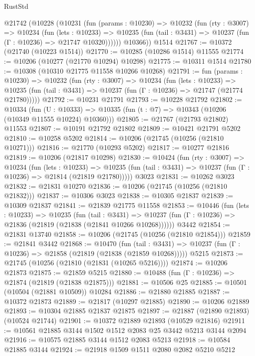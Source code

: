 \begin{lexlean}{RustStd}
\begin{coremodule}
    @21742
      (@10228
        (@10231
          (fun (params : @10230) =>
          @10232
            (fun (rty : @3007) =>
            @10234
              (fun (lets : @10233) =>
              @10235 (fun (tail : @3431) => @10237 (fun (Γ : @10236) => @21747 @10320))))))
        @10366))
    @1514
@21767 := @10372 (@21740 (@10223 @1514))
@21770 := @10285 (@10286 @1514) @11555
@21774 := @10206 (@10277 (@21770 @10294) @10298)
@21775 := @10311 @1514
@21780 := @10308 (@10310 @21775 @11558 @10266 @10268)
@21791 := fun (params : @10230) =>
  @10232
    (fun (rty : @3007) =>
    @10234
      (fun (lets : @10233) =>
      @10235 (fun (tail : @3431) => @10237 (fun (Γ : @10236) => @21747 (@21774 @21780)))))
@21792 := @10231 @21791
@21793 := @10228 @21792
@21802 := @10334
    (fun (U : @10333) => @10335 (fun (t : @7) => @10343 (@10206 (@10349 @11555 @10224) @10360)))
@21805 := @21767 (@21793 @21802) @11553
@21807 := @10191 @21792 @21802
@21809 := @10421 @21791 @5202
@21810 := @10258 @5202
@21814 := @10206 (@21745 (@10256 (@21810 @10271)))
@21816 := @21770 (@10293 @5202)
@21817 := @10277 @21816
@21819 := @10206 (@21817 @10298)
@21830 := @10424
    (fun (rty : @3007) =>
    @10234
      (fun (lets : @10233) =>
      @10235 (fun (tail : @3431) => @10237 (fun (Γ : @10236) => @21814 (@21819 @21780)))))
    @3023
@21831 := @10262 @3023
@21832 := @21831 @10270
@21836 := @10206 (@21745 (@10256 (@21810 @21832)))
@21837 := @10306 @3023
@21838 := @10305 @21837
@21839 := @10309 @21837
@21841 := @21839 @21775 @11558
@21853 := @10446
    (fun (lets : @10233) =>
    @10235
      (fun (tail : @3431) =>
      @10237 (fun (Γ : @10236) => @21836 (@21819 (@21838 (@21841 @10266 @10268))))))
    @3442
@21854 := @21831 @13740
@21858 := @10206 (@21745 (@10256 (@21810 @21854)))
@21859 := @21841 @3442
@21868 := @10470
    (fun (tail : @3431) => @10237 (fun (Γ : @10236) => @21858 (@21819 (@21838 (@21859 @10268)))))
    @5215
@21873 := @21745 (@10256 (@21810 (@21831 (@10265 @5216))))
@21874 := @10206 @21873
@21875 := @21859 @5215
@21880 := @10488 (fun (Γ : @10236) => @21874 (@21819 (@21838 @21875)))
@21881 := @10506 @25
@21885 := @10501 (@10504 (@21881 @10509)) @10284
@21886 := @21880 @21885
@21887 := @10372 @21873
@21889 := @21817 (@10297 @21885)
@21890 := @10206 @21889
@21893 := @10304 @21885 @21837 @21875
@21897 := @21887 (@21890 @21893) (@10524 @21744)
@21901 := @10372 @21889 @21893 (@10529 @21816)
@21911 := @10561 @21885 @3144 @1502 @1512 @2083 @25 @3442 @5213 @3144 @2094
@21916 := @10575 @21885 @3144 @1512 @2083 @5213
@21918 := @10584 @21885 @3144
@21924 := @21918 @1509 @1511 @2080 @2082 @5210 @5212

\end{coremodule}
\end{lexlean}

